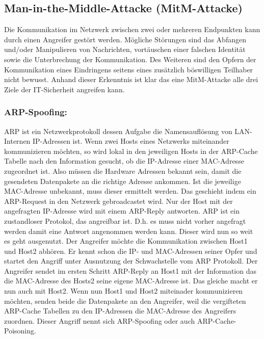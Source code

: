\subsection{Man-in-the-Middle-Attacke (MitM-Attacke)}
Die Kommunikation im Netzwerk zwischen zwei oder mehreren Endpunkten kann durch einen Angreifer gestört werden. Mögliche Störungen sind das Abfangen und/oder Manipulieren von Nachrichten, vortäuschen einer falschen Identität sowie die Unterbrechung der Kommunikation.\cite{ref_book_attack_1} Des Weiteren sind den Opfern der Kommunikation eines Eindringens seitens eines zusätzlich böswilligen Teilhaber nicht bewusst. Anhand  dieser Erkenntnis ist klar das eine MitM-Attacke alle drei Ziele der IT-Sicherheit angreifen kann. \cite{ref_ieee_attack_8}\par

\subsubsection{ARP-Spoofing:}
ARP ist ein Netzwerkprotokoll dessen Aufgabe die Namensauflösung von LAN-Internen IP-Adressen ist. Wenn zwei Hosts eines Netzwerks miteinander kommunizieren möchten, so wird lokal in den jeweiligen Hosts in der ARP-Cache Tabelle nach den Information gesucht, ob die IP-Adresse einer MAC-Adresse zugeordnet ist. Also müssen die Hardware Adressen bekannt sein, damit die gesendeten Datenpakete an die richtige Adresse ankommen.\cite{ref_ieee_attack_8}\cite{ref_url11} Ist die jeweilige MAC-Adresse unbekannt, muss dieser ermittelt werden. Das geschieht indem ein ARP-Request in den Netzwerk gebroadcastet wird. Nur der Host mit der angefragten IP-Adresse wird mit einem ARP-Reply antworten. ARP ist ein zustandloser Protokol, das angreifbar ist. D.h. es muss nicht vorher angefragt werden damit eine Antwort angenommen werden kann. Dieser wird nun so weit es geht ausgenutzt. Der Angreifer möchte die Kommunikation zwischen Host1 und Host2 abhören. Er kennt schon die IP- und MAC-Adressen seiner Opfer und startet den Angriff unter Ausnutzung der Schwachstelle vom ARP Protokoll. Der Angreifer sendet im ersten Schritt ARP-Reply an Host1 mit der Information das die MAC-Adresse des Hosts2 seine eigene MAC-Adresse ist. Das gleiche macht er nun auch mit Host2. Wenn nun Host1 und Host2 miteinader kommunizieren möchten, senden beide die Datenpakete an den Angreifer, weil die vergifteten ARP-Cache Tabellen zu den IP-Adressen die MAC-Adresse des Angreifers zuordnen. Dieser Angriff nennt sich ARP-Spoofing oder auch ARP-Cache-Poisoning.\cite{ref_ieee_attack_8} \cite{ref_url11} \par

